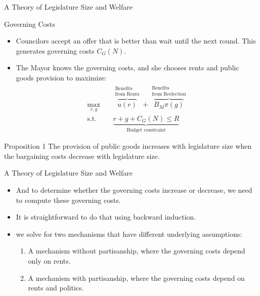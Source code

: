 \documentclass[11pt]{beamer}
\begin{document}
\begin{frame}{A Theory of Legislature Size and Welfare}
\begin{block}{Governing Costs}
\begin{itemize}  \itemsep1em
  \item Councilors accept an offer that is better than wait until the next round. This generates governing costs $C_G(N)$.
  \item The Mayor knows the governing costs, and she chooses rents and public goods provision to maximize:
  \[
  \begin{aligned}
   \max_{r, g} \quad & \overbrace{u(r)}^{\substack{\text{Benefits} \\ \text{from Rents}}} + \overbrace{B_M\pi(g)}^{\substack{\text{Benefits} \\ \text{from Reelection}}}\\
   \textrm{s.t.} \quad & \underbrace{r + g + C_G(N) \leq R}_{\text{Budget constraint}}
   \end{aligned}
   \]
   \end{itemize}
  \end{block}
  \pause \begin{block}{Proposition 1}
  The provision of public goods increases with legislature size when the bargaining costs decrease with legislature size.
  \end{block}
\end{frame}

\begin{frame}{A Theory of Legislature Size and Welfare}
\begin{itemize} \itemsep1em
    \item And to determine whether the governing costs increase or decrease, we need to compute these governing costs. 
    \item It is straightforward to do that using backward induction.
    \item we solve for two mechanisms that have different underlying assumptions:
    \begin{enumerate} \itemsep1em
        \item A mechanism without partisanship, where the governing costs depend only on rents.
        \item A mechanism with partisanship, where the governing costs depend on rents and politics.
    \end{enumerate}
\end{itemize}
\end{frame}
\end{document}
